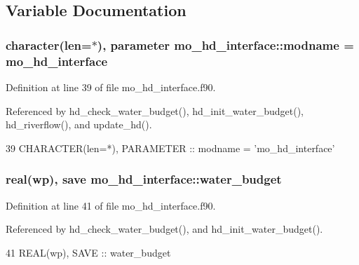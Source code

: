 \subsection{Variable Documentation}
\hypertarget{namespacemo__hd__interface_a946d721348db93e22eccc082dff915ce}{}
\subsubsection[{modname}]{\setlength{\rightskip}{0pt plus 5cm}character(len=$\ast$), parameter mo\+\_\+hd\+\_\+interface\+::modname = \textquotesingle{}mo\+\_\+hd\+\_\+interface\textquotesingle{}}\label{namespacemo__hd__interface_a946d721348db93e22eccc082dff915ce}


Definition at line 39 of file mo\+\_\+hd\+\_\+interface.\+f90.



Referenced by hd\+\_\+check\+\_\+water\+\_\+budget(), hd\+\_\+init\+\_\+water\+\_\+budget(), hd\+\_\+riverflow(), and update\+\_\+hd().


\begin{DoxyCode}
39   \textcolor{keywordtype}{CHARACTER(len=*)}, \textcolor{keywordtype}{PARAMETER} :: modname = \textcolor{stringliteral}{'mo\_hd\_interface'}
\end{DoxyCode}
\hypertarget{namespacemo__hd__interface_af6eeeb10243506ceeced69bf2bf7835f}{}
\subsubsection[{water\+\_\+budget}]{\setlength{\rightskip}{0pt plus 5cm}real(wp), save mo\+\_\+hd\+\_\+interface\+::water\+\_\+budget}\label{namespacemo__hd__interface_af6eeeb10243506ceeced69bf2bf7835f}


Definition at line 41 of file mo\+\_\+hd\+\_\+interface.\+f90.



Referenced by hd\+\_\+check\+\_\+water\+\_\+budget(), and hd\+\_\+init\+\_\+water\+\_\+budget().


\begin{DoxyCode}
41   \textcolor{keywordtype}{REAL(wp)}, \textcolor{keywordtype}{SAVE}  :: water\_budget
\end{DoxyCode}
